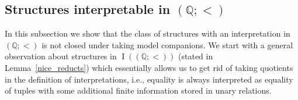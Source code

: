 \documentclass{amsart}
\theoremstyle{definition}
\theoremstyle{remark}
\numberwithin{equation}{section}
\newcommand\red[1]{\textcolor{red}{#1}}
\DeclareMathOperator{\I}{\operatorname{I}}
\newcommand{\aut}{\operatorname{Aut}}
\newcommand{\sym}{\operatorname{Sym}}
\newcommand{\fz}{\mathfrak{Z}}
\begin{document}

\subsection{Structures interpretable {in} $({\mathbb Q};<)$}
\label{sect:inter_q}
In this subsection we show that the class of structures with an interpretation in $({\mathbb Q};<)$ is not closed under taking model companions. 
We start with a general observation about structures in $\I((\mathbb{Q};<))$ (stated in Lemma~\ref{nice_reducts}) which essentially allows us to get rid of taking quotients in the definition of interpretations, i.e., equality is always interpreted as equality of tuples with some additional finite information stored in unary relations.
\end{document}
